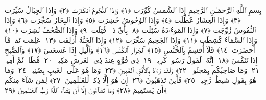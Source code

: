 
  
    
  
    
    

\nopagebreak
  بِسمِ ٱللَّهِ ٱلرَّحمَـٰنِ ٱلرَّحِيمِ
  إِذَا ٱلشَّمسُ كُوِّرَت ﴿١﴾
 وَإِذَا ٱلنُّجُومُ ٱنكَدَرَت ﴿٢﴾
 وَإِذَا ٱلجِبَالُ سُيِّرَت ﴿٣﴾
 وَإِذَا ٱلعِشَارُ عُطِّلَت ﴿٤﴾
 وَإِذَا ٱلوُحُوشُ حُشِرَت ﴿٥﴾
 وَإِذَا ٱلبِحَارُ سُجِّرَت ﴿٦﴾
 وَإِذَا ٱلنُّفُوسُ زُوِّجَت ﴿٧﴾
 وَإِذَا ٱلمَوءُۥدَةُ سُئِلَت ﴿٨﴾
 بِأَىِّ ذَنۢبٍۢ قُتِلَت ﴿٩﴾
 وَإِذَا ٱلصُّحُفُ نُشِرَت ﴿١٠﴾
 وَإِذَا ٱلسَّمَآءُ كُشِطَت ﴿١١﴾
 وَإِذَا ٱلجَحِيمُ سُعِّرَت ﴿١٢﴾
 وَإِذَا ٱلجَنَّةُ أُزلِفَت ﴿١٣﴾
 عَلِمَت نَفسٌۭ مَّآ أَحضَرَت ﴿١٤﴾
 فَلَآ أُقسِمُ بِٱلخُنَّسِ ﴿١٥﴾
 ٱلجَوَارِ ٱلكُنَّسِ ﴿١٦﴾
 وَٱلَّيلِ إِذَا عَسعَسَ ﴿١٧﴾
 وَٱلصُّبحِ إِذَا تَنَفَّسَ ﴿١٨﴾
 إِنَّهُۥ لَقَولُ رَسُولٍۢ كَرِيمٍۢ ﴿١٩﴾
 ذِى قُوَّةٍ عِندَ ذِى ٱلعَرشِ مَكِينٍۢ ﴿٢٠﴾
 مُّطَاعٍۢ ثَمَّ أَمِينٍۢ ﴿٢١﴾
 وَمَا صَاحِبُكُم بِمَجنُونٍۢ ﴿٢٢﴾
 وَلَقَد رَءَاهُ بِٱلأُفُقِ ٱلمُبِينِ ﴿٢٣﴾
 وَمَا هُوَ عَلَى ٱلغَيبِ بِضَنِينٍۢ ﴿٢٤﴾
 وَمَا هُوَ بِقَولِ شَيطَٰنٍۢ رَّجِيمٍۢ ﴿٢٥﴾
 فَأَينَ تَذهَبُونَ ﴿٢٦﴾
 إِن هُوَ إِلَّا ذِكرٌۭ لِّلعَـٰلَمِينَ ﴿٢٧﴾
 لِمَن شَآءَ مِنكُم أَن يَستَقِيمَ ﴿٢٨﴾
 وَمَا تَشَآءُونَ إِلَّآ أَن يَشَآءَ ٱللَّهُ رَبُّ ٱلعَـٰلَمِينَ ﴿٢٩﴾
 
